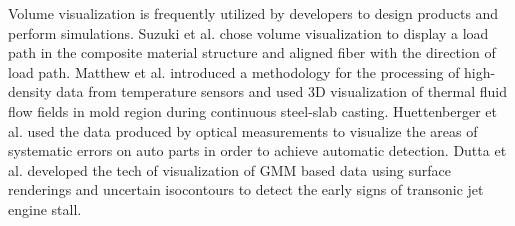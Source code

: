 \documentclass[a4paper,fleqn]{cas-dc}
\begin{document}
Volume visualization is frequently utilized by developers to design products and perform simulations.
Suzuki et al. \cite{Suzuki2020} chose volume visualization to display a load path in the composite material structure and aligned fiber with the direction of load path.
Matthew et al. \cite{Zappulla2019} introduced a methodology for the processing of high-density data from temperature sensors and used 3D visualization of thermal fluid flow fields in mold region during continuous steel-slab casting.
Huettenberger et al. \cite{Huettenberger2015} used the data produced by optical measurements to visualize the areas of systematic errors on auto parts in order to achieve automatic detection.
Dutta et al. \cite{dutta2016situ} developed the tech of visualization of GMM based data using surface renderings and uncertain isocontours to detect the early signs of transonic jet engine stall.

\end{document}
